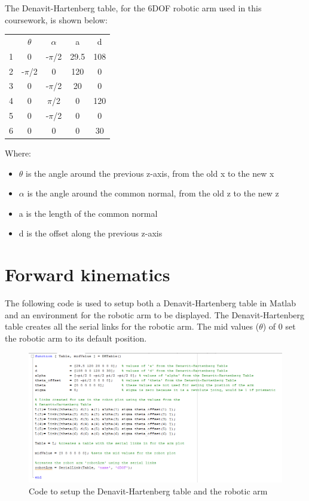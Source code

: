 \documentclass [11pt]{report}
\begin{document}
The Denavit-Hartenberg table, for the 6DOF robotic arm used in this coursework, is shown below:

\begin{center}
\begin{tabular}{ ||c||c|c|c|c|| } 
 \hline
 & $\theta$ & $\alpha$ & a & d \\ 
\hhline{#=#=|=|=|=#}
 1 & 0 & -$\pi$/2 & 29.5 & 108\\
\hline 
 2 & -$\pi$/2 & 0 & 120 &0\\ 
\hline 
 3 & 0 & -$\pi$/2 & 20 &0\\ 
\hline 
 4 & 0 & $\pi$/2 & 0 & 120\\ 
\hline 
 5 & 0 & -$\pi$/2 & 0 & 0\\ 
\hline 
 6 & 0 & 0 & 0 & 30\\ 
\hline
\end{tabular}
\end{center}

Where:
\begin{itemize}
\item $\theta$ is the angle around the previous z-axis, from the old x to the new x
\item $\alpha$ is the angle around the common normal, from the old z to the new z
\item a is the length of the common normal
\item d is the offset along the previous z-axis
\end{itemize}

\section{Forward kinematics}

The following code is used to setup both a Denavit-Hartenberg table in Matlab and an environment for the robotic arm to be displayed. The Denavit-Hartenberg table creates all the serial links for the robotic arm. The mid values ($\theta$) of 0 set the robotic arm to its default position.

\begin{figure}[H]
\centerline{\includegraphics[width=12cm]{DHTablewithoutplot.png}}
\caption{Code to setup the Denavit-Hartenberg table and the robotic arm}
\label{fig}
\end{figure}
\end{document}
